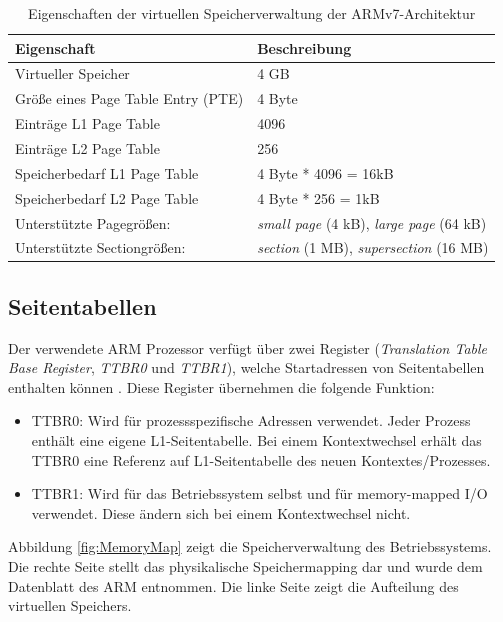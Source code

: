 \begin{table}[H]
\begin{tabular}{p{7cm} | p{7cm}}
  \textbf{Eigenschaft} & \textbf{Beschreibung} \\ \hline
  Virtueller Speicher & 4 GB\\  
  Größe eines Page Table Entry (PTE) & 4 Byte \\
  Einträge L1 Page Table & 4096\\
  Einträge L2 Page Table & 256\\
  Speicherbedarf L1 Page Table & 4 Byte * 4096 = 16kB \\
  Speicherbedarf L2 Page Table & 4 Byte * 256 = 1kB\\
  Unterstützte Pagegrößen: & \emph{small page} (4 kB), \emph{large page} (64 kB)\\
  Unterstützte Sectiongrößen: & \emph{section} (1 MB), \emph{supersection} (16 MB)\\
 \end{tabular}
 \caption{Eigenschaften der virtuellen Speicherverwaltung der ARMv7-Architektur}
 \label{table:GeneralVirtualMemory}
\end{table}

\subsection*{Seitentabellen}

Der verwendete ARM Prozessor verfügt über zwei Register (\emph{Translation Table Base Register}, \emph{TTBR0} und \emph{TTBR1}), welche Startadressen von Seitentabellen enthalten können \cite[S. B3-1320]{ARM:ARM}. Diese Register übernehmen die folgende Funktion:

\begin{itemize}
	\item TTBR0: Wird für prozessspezifische Adressen verwendet. Jeder Prozess enthält eine eigene L1-Seitentabelle. Bei einem Kontextwechsel erhält das TTBR0 eine Referenz auf L1-Seitentabelle des neuen Kontextes/Prozesses.
	\item TTBR1: Wird für das Betriebssystem selbst und für memory-mapped I/O verwendet. Diese ändern sich bei einem Kontextwechsel nicht.
\end{itemize}


Abbildung \ref{fig:MemoryMap} zeigt die Speicherverwaltung des Betriebssystems. Die rechte Seite stellt das physikalische Speichermapping dar und wurde dem Datenblatt des ARM \cite[S. 155]{ARM:TRM} entnommen. Die linke Seite zeigt die Aufteilung des virtuellen Speichers.\\

